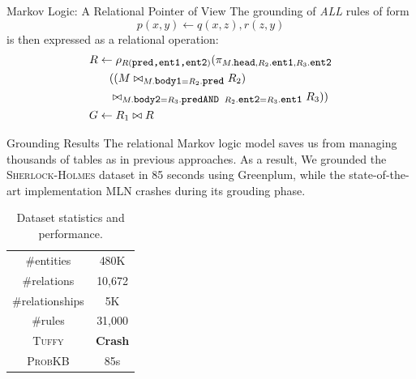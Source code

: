 \documentclass[onlymath,xcolor=pdftex,dvipsnames,table]{beamer}
\newcommand{\probkb}{\textsc{ProbKB}\xspace}
\newcommand{\sherlock}{\textsc{Sherlock}\xspace}
\newcommand{\holmes}{\textsc{Holmes}\xspace}
\newcommand{\tuffy}{\textsc{Tuffy}\xspace}
\let\oldemph\emph
\renewcommand{\emph}[1]{{\color{Blue}\oldemph{#1}}}
\newcommand{\stt}[1]{\texttt{\small #1}\xspace}
\begin{document}
\begin{frame}{Markov Logic: A Relational Pointer of View}
The grounding of \emph{ALL} rules of form $$p(x,y)\leftarrow q(x,z),
r(z,y)$$ is then expressed as a relational operation:
\begin{align}\small
R&\leftarrow\rho_{R(\stt{pred,ent1,ent2})}(\pi_{M.\stt{head}, R_2.\stt{ent1}, R_3.\stt{ent2}}\\\nonumber
&\phantom{\leftarrow}((M\bowtie_{M.\stt{body1}=R_2.\stt{pred}} R_2)\\\nonumber
&\phantom{\leftarrow}\bowtie_{M.\stt{body2}=R_3.\stt{pred} \stt{ AND } R_2.\stt{ent2}=R_3.\stt{ent1}} R_3))\nonumber\\
G&\leftarrow R_1\bowtie R\nonumber
\end{align}
\end{frame}


\begin{frame}{Grounding Results}
The relational Markov logic model saves us from managing thousands of
tables as in previous approaches. As a result, We grounded the
\sherlock-\holmes dataset in 85 seconds using Greenplum, while the
state-of-the-art implementation MLN crashes during its grouding phase.
\begin{table}
  \centering
  \begin{tabular}{|c|c|}\hline
   \#entities  & 480K   \\
   \#relations & 10,672 \\
   \#relationships & 5K \\
   \#rules     & 31,000 \\
   \tuffy      & \textbf{\color{Red}Crash} \\
   \probkb     & 85s\\
   \hline
  \end{tabular}
  \caption{Dataset statistics and performance.}
\end{table}
\end{frame}
\end{document}

